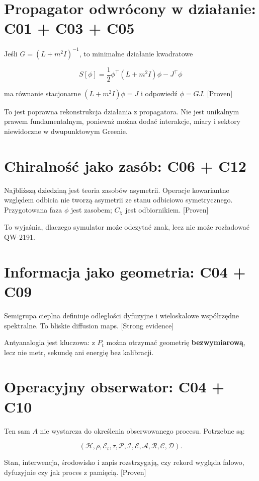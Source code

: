 \documentclass[11pt,a4paper,openany]{report}
\newcommand{\statusProven}{\textcolor{fingreen}{[Proven]}}
\newcommand{\statusStrong}{\textcolor{finblue}{[Strong evidence]}}
\begin{document}
\section{Propagator odwrócony w działanie: C01 + C03 + C05}

Jeśli \(G=(L+m^2I)^{-1}\), to minimalne działanie kwadratowe

\[
S[\phi]=\frac12\phi^\top(L+m^2I)\phi-J^\top\phi
\]

ma równanie stacjonarne \((L+m^2I)\phi=J\) i odpowiedź \(\phi=GJ\). \statusProven{}

To jest poprawna rekonstrukcja działania z propagatora. Nie jest unikalnym prawem fundamentalnym, poniewa\.z mo\.zna dodać interakcje, miary i sektory niewidoczne w dwupunktowym Greenie.

\section{Chiralność jako zasób: C06 + C12}

Najbli\.zszą dziedziną jest teoria zasobów asymetrii. Operacje kowariantne względem odbicia nie tworzą asymetrii ze stanu odbiciowo symetrycznego. Przygotowana faza \(\phi\) jest zasobem; \(C_\chi\) jest odbiornikiem. \statusProven{}

To wyjaśnia, dlaczego symulator mo\.ze odczytać znak, lecz nie mo\.ze rozładować QW-2191.

\section{Informacja jako geometria: C04 + C09}

Semigrupa cieplna definiuje odległości dyfuzyjne i wieloskalowe współrzędne spektralne. To bliskie diffusion maps. \statusStrong{}

Antyanalogia jest kluczowa: z \(P_t\) mo\.zna otrzymać geometrię \textbf{bezwymiarową}, lecz nie metr, sekundę ani energię bez kalibracji.

\section{Operacyjny obserwator: C04 + C10}

Ten sam \(A\) nie wystarcza do określenia obserwowanego procesu. Potrzebne są:

\[
(\mathcal H,\rho,\mathcal E_t,\tau,\mathcal P,\mathcal I,\mathcal E,
\mathcal A,\mathcal R,\mathcal C,\mathcal D).
\]

Stan, interwencja, środowisko i zapis rozstrzygają, czy rekord wygląda falowo, dyfuzyjnie czy jak proces z pamięcią. \statusProven{}
\end{document}
